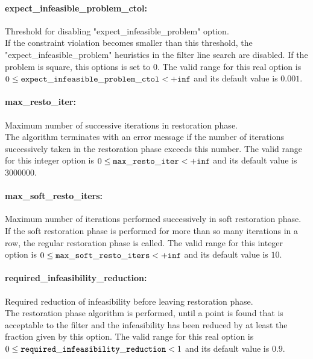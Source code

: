 \paragraph{expect\_infeasible\_problem\_ctol:}\label{sec:expect_infeasible_problem_ctol} Threshold for disabling "expect\_infeasible\_problem" option. $\;$ \\
 If the constraint violation becomes smaller than
this threshold, the "expect\_infeasible\_problem"
heuristics in the filter line search are
disabled. If the problem is square, this options
is set to 0. The valid range for this real option is 
$0 \le {\tt expect\_infeasible\_problem\_ctol } <  {\tt +inf}$
and its default value is $0.001$.


\paragraph{max\_resto\_iter:}\label{sec:max_resto_iter} Maximum number of successive iterations in restoration phase. $\;$ \\
 The algorithm terminates with an error message if
the number of iterations successively taken in
the restoration phase exceeds this number. The valid range for this integer option is
$0 \le {\tt max\_resto\_iter } <  {\tt +inf}$
and its default value is $3000000$.


\paragraph{max\_soft\_resto\_iters:}\label{sec:max_soft_resto_iters} Maximum number of iterations performed successively in soft restoration phase. $\;$ \\
 If the soft restoration phase is performed for
more than so many iterations in a row, the
regular restoration phase is called. The valid range for this integer option is
$0 \le {\tt max\_soft\_resto\_iters } <  {\tt +inf}$
and its default value is $10$.


\paragraph{required\_infeasibility\_reduction:}\label{sec:required_infeasibility_reduction} Required reduction of infeasibility before leaving restoration phase. $\;$ \\
 The restoration phase algorithm is performed,
until a point is found that is acceptable to the
filter and the infeasibility has been reduced by
at least the fraction given by this option. The valid range for this real option is 
$0 \le {\tt required\_infeasibility\_reduction } <  1$
and its default value is $0.9$.

